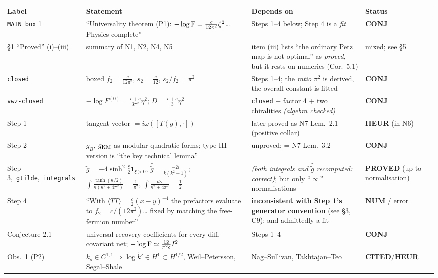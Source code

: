 \documentclass[11pt]{article}
\newcommand{\stPR}{{\color{okgreen}\textsf{\scriptsize\bfseries PROVED}}}
\newcommand{\stCIT}{{\color{navy}\textsf{\scriptsize\bfseries CITED}}}
\newcommand{\stNUM}{{\color{orange!80!black}\textsf{\scriptsize\bfseries NUM}}}
\newcommand{\stHEU}{{\color{warn}\textsf{\scriptsize\bfseries HEUR}}}
\newcommand{\stCON}{{\color{warn}\textsf{\scriptsize\bfseries CONJ}}}
\newcommand{\NI}{N1}\newcommand{\NII}{N2}\newcommand{\NIII}{N3}
\newcommand{\NIV}{N4}\newcommand{\NV}{N5}\newcommand{\NVI}{N6}\newcommand{\NVII}{N7}
\newcommand{\CMI}{I}
\newcommand{\zz}{\zeta}
\newcommand{\gt}{\widetilde g}
\newcommand{\gh}{\widehat{\gt}}
\begin{document}
{\footnotesize\setlength{\emergencystretch}{4em}\sloppy{}\relax{}\relax
\begin{tabularx}{\textwidth}{L{0.155\textwidth} X L{0.210\textwidth} L{0.098\textwidth}}
\toprule
\textbf{Label} & \textbf{Statement} & \textbf{Depends on} & \textbf{Status}\\
\midrule\endhead
\texttt{MAIN box} 1 & ``Universality theorem (P1): $-\log\Fid=\frac c{12\pi^2}\zz^2$\dots{} Physics complete'' & Steps 1--4 below; Step 4 is a \emph{fit} & \stCON \\
\S1 ``Proved'' (i)--(iii) & summary of \NI, \NII, \NIV, \NV & item (iii) lists ``the ordinary Petz map is not optimal'' as \emph{proved}, but it rests on numerics (Cor.~5.1) & mixed; see \S5 \\
\texttt{closed} & boxed $f_2=\frac c{12\pi^2}$, $s_2=\frac c{12}$, $s_2/f_2=\pi^2$ & Steps 1--4; the \emph{ratio} $\pi^2$ is derived, the overall constant is fitted & \stCON \\
\texttt{vwz-closed} & $-\log F^{(0)}=\frac{c+\bar c}{3\pi^2}\eta^2$; $D=\frac{c+\bar c}3\eta^2$ & \texttt{closed} + factor 4 + two chiralities \emph{(algebra checked)} & \stCON \\
Step 1 & tangent vector $=i\omega([T(g),\cdot])$ & later proved as \NVII{} Lem.~2.1 (positive collar) & \stHEU{} (in \NVI) \\
Step 2 & $g_B$, $g_{\rm KM}$ as modular quadratic forms; type-III version is ``the key technical lemma'' & unproved; = \NVII{} Lem.~3.2 & \stCON \\
Step 3,\ \texttt{gtilde},\allowbreak\ \texttt{integrals} & $\gt=-4\sinh^2\frac\xi2\mathbf1_{\xi>0}$, $\gh=\frac{-2i}{k(k^2+1)}$; $\int\frac{\tanh(\kappa/2)}{\kappa(\kappa^2+4\pi^2)}=\frac1{\pi^2}$, $\int\frac{d\kappa}{\kappa^2+4\pi^2}=\frac12$ & \emph{(both integrals and $\gh$ recomputed: correct)}; but only ``$\propto$'' normalisations & \stPR{} (up to normalisation) \\
Step 4 & ``With $\langle TT\rangle=\frac c2(x-y)^{-4}$ the prefactors evaluate to $f_2=c/(12\pi^2)$\dots{} fixed by matching the free-fermion number'' & \textbf{inconsistent with Step 1's generator convention} (see \S3, C9); and admittedly a fit & \stNUM{} / error \\
Conjecture 2.1 & universal recovery coefficients for every diff.-covariant net; $-\log\Fid\simeq\frac{12}{\pi^2c}\CMI^2$ & Steps 1--4 & \stCON \\
Obs.~1 (P2) & $k_s\in C^{1,1}\Rightarrow\log\widetilde k'\in H^1\subset H^{1/2}$, Weil--Petersson, Segal--Shale & Nag--Sullivan, Takhtajan--Teo & \stCIT{}/\stHEU \\

\end{tabularx}}
\end{document}

